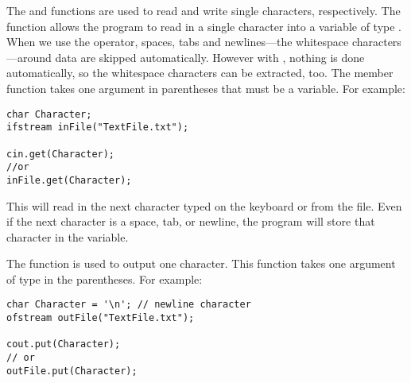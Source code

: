 The  and  functions are used to read and write single characters, respectively. 
The function  allows the program to read in a single character into a variable of type . 
When we use the \Code{>>} operator, spaces, tabs and newlines---the whitespace characters---around data are skipped automatically. 
However with , nothing is done automatically, so the whitespace characters can be extracted, too. 
The member function  takes one argument in parentheses that must be a  variable. 
For example:

\noindent\begin{minipage}{\linewidth}\begin{lstlisting}
char Character;
ifstream inFile("TextFile.txt");

cin.get(Character);
//or
inFile.get(Character);
\end{lstlisting}\end{minipage}

This will read in the next character typed on the keyboard or from the file. 
Even if the next character is a space, tab, or newline, the program will store that character in the variable. 

The  function is used to output one character. 
This function takes one argument of type  in the parentheses. 
For example:

\noindent\begin{minipage}{\linewidth}\begin{lstlisting}
char Character = '\n'; // newline character
ofstream outFile("TextFile.txt");

cout.put(Character);
// or
outFile.put(Character);
\end{lstlisting}\end{minipage}


